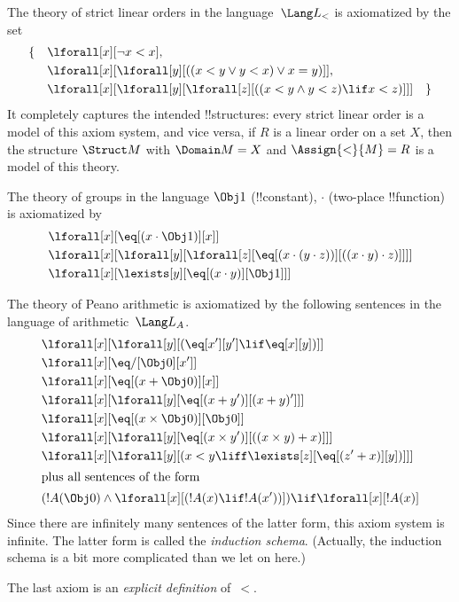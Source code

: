 \documentclass[../../../include/open-logic-section]{subfiles}
\begin{document}

\begin{ex}
The theory of strict linear orders in the language~$\Lang L_<$ is
axiomatized by the set
\begin{align*}
\{\quad & \lforall[x][\lnot x < x], \\
& \lforall[x][\lforall[y][((x < y \lor y <
    x) \lor x = y)]], \\
& \lforall[x][\lforall[y][\lforall[z][((x < y
      \land y < z) \lif x < z)]]] \quad \}
\end{align*}
It completely captures the intended !!{structure}s: every strict
linear order is a model of this axiom system, and vice versa, if $R$
is a linear order on a set $X$, then the structure $\Struct M$ with
$\Domain M = X$ and $\Assign{<}{M} = R$ is a model of this theory.
\end{ex}

\begin{ex}
The theory of groups in the language $\Obj 1$ (!!{constant}), $\cdot$
(two-place !!{function}) is axiomatized by
\begin{align*}
& \lforall[x][\eq[(x \cdot \Obj 1)][x]]\\
& \lforall[x][\lforall[y][\lforall[z][\eq[(x \cdot (y \cdot z))][((x
          \cdot y) \cdot z)]]]]\\
& \lforall[x][\lexists[y][\eq[(x \cdot y)][\Obj 1]]]
\end{align*}
\end{ex}

\begin{ex}
The theory of Peano arithmetic is axiomatized by the following
sentences in the language of arithmetic~$\Lang L_A$.
\begin{align*}
& \lforall[x][\lforall[y][(\eq[x'][y'] \lif \eq[x][y])]]\\
& \lforall[x][\eq/[\Obj 0][x']]\\
& \lforall[x][\eq[(x + \Obj 0)][x]]\\
& \lforall[x][\lforall[y][\eq[(x + y')][(x + y)']]]\\
& \lforall[x][\eq[(x \times \Obj 0)][\Obj 0]]\\
& \lforall[x][\lforall[y][\eq[(x \times y')][((x \times y) + x)]]]\\
& \lforall[x][\lforall[y][(x < y \liff \lexists[z][\eq[(z' + x)][y])]]]\\
\intertext{plus all sentences of the form}
& (!A(\Obj 0) \land \lforall[x][(!A(x) \lif !A(x'))]) \lif \lforall[x][!A(x)]
\end{align*}
Since there are infinitely many sentences of the latter form, this
axiom system is infinite.  The latter form is called the
\emph{induction schema}. (Actually, the induction schema is a bit more
complicated than we let on here.)

The last axiom is an \emph{explicit definition} of~$<$.
\end{ex}
\end{document}
